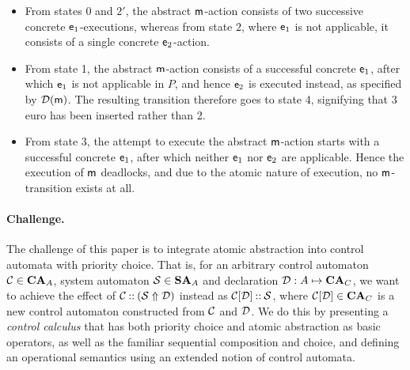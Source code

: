 \begin{itemize}
\item From states 0 and $2'$, the abstract $\mathsf{m}$-action consists of two successive concrete $\mathsf{e}_1$-executions, whereas from state $2$, where $\mathsf{e}_1$ is not applicable, it consists of a single concrete $\mathsf{e}_2$-action.

\item From state 1, the abstract $\mathsf{m}$-action consists of a successful concrete $\mathsf{e}_1$, after which $\mathsf{e}_1$ is not applicable in $P$, and hence $\mathsf{e}_2$ is executed instead, as specified by $\mathcal{D}(\mathsf{m})$. The resulting transition therefore goes to state 4, signifying that 3 euro has been inserted rather than 2.

\item From state 3, the attempt to execute the abstract $\mathsf{m}$-action starts with a successful concrete $\mathsf{e}_1$, after which neither $\mathsf{e}_1$ nor $\mathsf{e}_2$ are applicable. Hence the execution of $\mathsf{m}$ deadlocks, and due to the atomic nature of execution, no $\mathsf{m}$-transition exists at all.
\end{itemize}

\paragraph{Challenge.}

The challenge of this paper is to integrate atomic abstraction into control automata with priority choice. That is, for an arbitrary control automaton $\mathcal{C}\in \mathbf{CA}_A$, system automaton $\mathcal{S}\in \mathbf{SA}_A$ and declaration $\mathcal{D}:A\mapsto \mathbf{CA}_C$, we want to achieve the effect of $\mathcal{C}\mathbin{{:}{:}} (\mathcal{S}\Uparrow \mathcal{D})$ instead as $\mathcal{C}[\mathcal{D}]\mathbin{{:}{:}} \mathcal{S}$, where $\mathcal{C}[\mathcal{D}]\in \mathbf{CA}_C$ is a new control automaton constructed from $\mathcal{C}$ and $\mathcal{D}$. We do this by presenting a \emph{control calculus} that has both priority choice and atomic abstraction as basic operators, as well as the familiar sequential composition and choice, and defining an operational semantics using an extended notion of control automata.